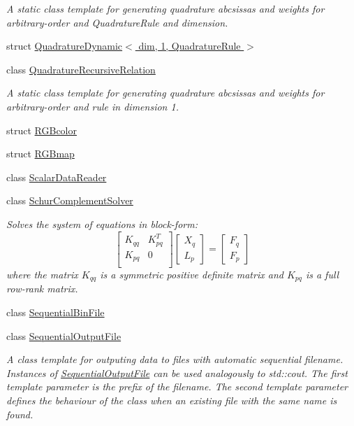 \begin{DoxyCompactItemize}
\begin{DoxyCompactList}\small\item\em A static class template for generating quadrature abcsissas and weights for arbitrary-\/order and Quadrature\+Rule and dimension. \end{DoxyCompactList}\item 
struct \hyperlink{structmodel_1_1_quadrature_dynamic_3_01dim_00_011_00_01_quadrature_rule_01_4}{Quadrature\+Dynamic$<$ dim, 1, Quadrature\+Rule $>$}
\item 
class \hyperlink{classmodel_1_1_quadrature_recursive_relation}{Quadrature\+Recursive\+Relation}
\begin{DoxyCompactList}\small\item\em A static class template for generating quadrature abcsissas and weights for arbitrary-\/order and rule in dimension 1. \end{DoxyCompactList}\item 
struct \hyperlink{structmodel_1_1_r_g_bcolor}{R\+G\+Bcolor}
\item 
struct \hyperlink{structmodel_1_1_r_g_bmap}{R\+G\+Bmap}
\item 
class \hyperlink{classmodel_1_1_scalar_data_reader}{Scalar\+Data\+Reader}
\item 
class \hyperlink{classmodel_1_1_schur_complement_solver}{Schur\+Complement\+Solver}
\begin{DoxyCompactList}\small\item\em Solves the system of equations in block-\/form\+: \[ \left[ \begin{array}{ll} K_{qq} & K_{pq}^T\\ K_{pq} & 0\\ \end{array} \right] \left[ \begin{array}{l} X_q\\ L_p \end{array} \right] = \left[ \begin{array}{l} F_q\\ F_p \end{array} \right] \] where the matrix $K_{qq}$ is a symmetric positive definite matrix and $K_{pq}$ is a full row-\/rank matrix. \end{DoxyCompactList}\item 
class \hyperlink{classmodel_1_1_sequential_bin_file}{Sequential\+Bin\+File}
\item 
class \hyperlink{classmodel_1_1_sequential_output_file}{Sequential\+Output\+File}
\begin{DoxyCompactList}\small\item\em A class template for outputing data to files with automatic sequential filename. Instances of \hyperlink{classmodel_1_1_sequential_output_file}{Sequential\+Output\+File} can be used analogously to std\+::cout. The first template parameter is the prefix of the filename. The second template parameter defines the behaviour of the class when an existing file with the same name is found. \end{DoxyCompactList}\item 

\end{DoxyCompactItemize}
